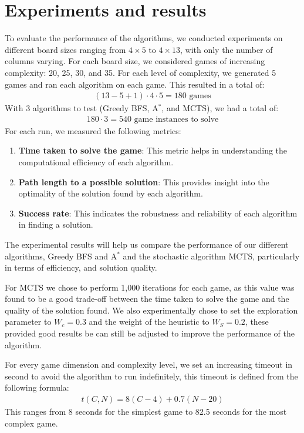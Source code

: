 \chapter{Experiments and results}
To evaluate the performance of the algorithms, we conducted experiments on different board sizes ranging from $4 \times 5$ to $4 \times 13$, with only the number of columns varying. For each board size, we considered games of increasing complexity: 20, 25, 30, and 35. For each level of complexity, we generated 5 games and ran each algorithm on each game. This resulted in a total of:
\begin{align*}
(13-5+1) \cdot 4 \cdot 5 = 180 \text{ games}
\end{align*}
With 3 algorithms to test (Greedy BFS, A$^*$, and MCTS), we had a total of:
\begin{align*}
  180 \cdot 3 = 540 \text{ game instances to solve}
\end{align*}
For each run, we measured the following metrics:
\begin{enumerate}
  \item \textbf{Time taken to solve the game}: This metric helps in understanding the computational efficiency of each algorithm.
  \item \textbf{Path length to a possible solution}: This provides insight into the optimality of the solution found by each algorithm.
  \item \textbf{Success rate}: This indicates the robustness and reliability of each algorithm in finding a solution.
\end{enumerate}
The experimental results will help us compare the performance of our different algorithms, Greedy BFS and A$^*$ and the stochastic algorithm MCTS, particularly in terms of efficiency, and solution quality.

For MCTS we chose to perform 1,000 iterations for each game, as this value was found to be a good trade-off between the time taken to solve the game and the quality of the solution found. We also experimentally chose to set the exploration parameter to $W_c = 0.3$ and the weight of the heuristic to $W_S = 0.2$, these provided good results be can still be adjusted to improve the performance of the algorithm.

For every game dimension and complexity level, we set an increasing timeout in second to avoid the algorithm to run indefinitely, this timeout is defined from the following formula:
\begin{align*}
  t(C, N) = 8(C-4) + 0.7(N-20)
\end{align*}
This ranges from 8 seconds for the simplest game to 82.5 seconds for the most complex game.

